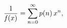 \[\frac{1}{\mathop{\mathit{f}\/}\nolimits\!\left(x\right)}=\sum_{n=0}^{\infty}%
\mathop{p\/}\nolimits\!\left(n\right)x^{n},\]